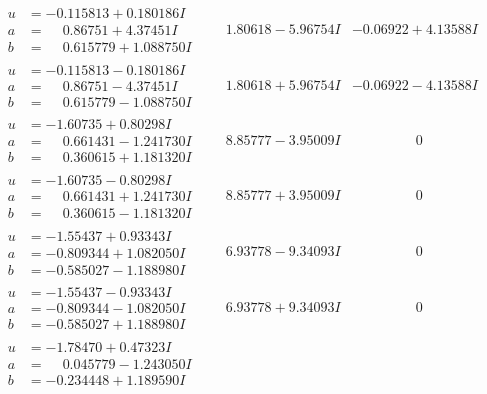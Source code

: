 \documentclass[1p]{elsarticle_modified}
\theoremstyle{definition}
\begin{document}
$$\begin{array}{c|c|c}
\begin{aligned}
u &= -0.115813 + 0.180186 I \\
a &= \phantom{-}0.86751 + 4.37451 I \\
b &= \phantom{-}0.615779 + 1.088750 I\end{aligned}
 & \phantom{-}1.80618 - 5.96754 I & -0.06922 + 4.13588 I \\ \hline\begin{aligned}
u &= -0.115813 - 0.180186 I \\
a &= \phantom{-}0.86751 - 4.37451 I \\
b &= \phantom{-}0.615779 - 1.088750 I\end{aligned}
 & \phantom{-}1.80618 + 5.96754 I & -0.06922 - 4.13588 I \\ \hline\begin{aligned}
u &= -1.60735 + 0.80298 I \\
a &= \phantom{-}0.661431 - 1.241730 I \\
b &= \phantom{-}0.360615 + 1.181320 I\end{aligned}
 & \phantom{-}8.85777 - 3.95009 I & \phantom{-0.000000 } 0 \\ \hline\begin{aligned}
u &= -1.60735 - 0.80298 I \\
a &= \phantom{-}0.661431 + 1.241730 I \\
b &= \phantom{-}0.360615 - 1.181320 I\end{aligned}
 & \phantom{-}8.85777 + 3.95009 I & \phantom{-0.000000 } 0 \\ \hline\begin{aligned}
u &= -1.55437 + 0.93343 I \\
a &= -0.809344 + 1.082050 I \\
b &= -0.585027 - 1.188980 I\end{aligned}
 & \phantom{-}6.93778 - 9.34093 I & \phantom{-0.000000 } 0 \\ \hline\begin{aligned}
u &= -1.55437 - 0.93343 I \\
a &= -0.809344 - 1.082050 I \\
b &= -0.585027 + 1.188980 I\end{aligned}
 & \phantom{-}6.93778 + 9.34093 I & \phantom{-0.000000 } 0 \\ \hline\begin{aligned}
u &= -1.78470 + 0.47323 I \\
a &= \phantom{-}0.045779 - 1.243050 I \\
b &= -0.234448 + 1.189590 I\end{aligned}

\end{array}$$
\end{document}
